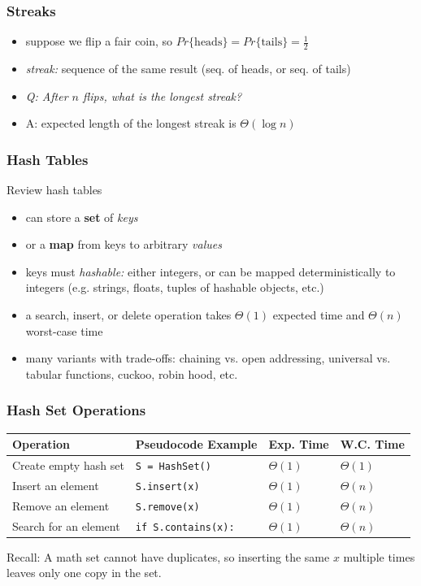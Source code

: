 \documentclass[10pt]{beamer}
\begin{document}
\begin{frame} \frametitle{Streaks}
\begin{itemize}
  \item suppose we flip a fair coin, so $Pr\{\text{heads}\} = Pr\{\text{tails}\}=\frac{1}{2}$
  \item \emph{streak:} sequence of the same result (seq. of heads, or seq. of tails)
  \item \emph{Q: After $n$ flips, what is the longest streak?}
  \item A: expected length of the longest streak is $\Theta(\log n)$
\end{itemize}
\end{frame}

\begin{frame} \frametitle{Hash Tables}
Review hash tables
\begin{itemize}
  \item can store a \textbf{set} of \emph{keys}
  \item or a \textbf{map} from keys to arbitrary \emph{values}
  \item keys must \emph{hashable:} either integers, or can be mapped deterministically
    to integers (e.g. strings, floats, tuples of hashable objects, etc.)
  \item a search, insert, or delete operation takes $\Theta(1)$ expected time and
    $\Theta(n)$ worst-case time
  \item many variants with trade-offs: chaining vs. open addressing, universal vs.
    tabular functions, cuckoo, robin hood, etc.
\end{itemize}
\end{frame}

\begin{frame} \frametitle{Hash Set Operations}
  \begin{center}
    \begin{tabular}{llll}
      \textbf{Operation} & \textbf{Pseudocode Example} & \textbf{Exp. Time} & \textbf{W.C. Time} \\ \hline
      Create empty hash set & \texttt{S = HashSet()} & $\Theta(1)$ & $\Theta(1)$ \\
      Insert an element & \texttt{S.insert(x)} & $\Theta(1)$ & $\Theta(n)$ \\
      Remove an element & \texttt{S.remove(x)} & $\Theta(1)$ & $\Theta(n)$ \\
      Search for an element & \texttt{if S.contains(x):} & $\Theta(1)$ & $\Theta(n)$ \\
    \end{tabular}
  \end{center}

  \vspace{12pt}
  Recall: A math set cannot have duplicates, so inserting the same $x$ multiple times leaves only one copy in the set.
\end{frame}
\end{document}
